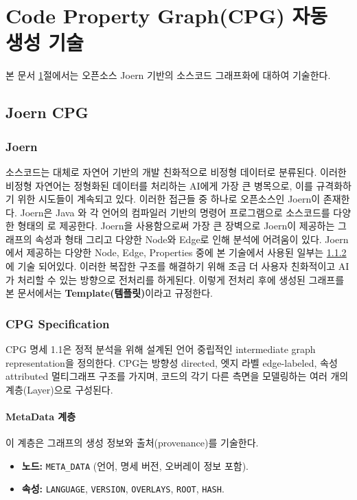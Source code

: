 \clearpage

\section{Code Property Graph(CPG) 자동 생성 기술}\label{sec:cpg}

본 문서 \ref{sec:cpg}절에서는 오픈소스 Joern 기반의 소스코드 그래프화에 대하여 기술한다.

\subsection{Joern CPG}

\subsubsection{Joern}
소스코드는 대체로 자연어 기반의 개발 친화적으로 비정형 데이터로 분류된다.
이러한 비정형 자연어는 정형화된 데이터를 처리하는 AI에게 가장 큰 병목으로, 이를 규격화하기 위한 시도들이 계속되고 있다.
이러한 접근들 중 하나로 오픈소스인 Joern이 존재한다.
Joern은 Java 와 각 언어의 컴파일러 기반의 명령어 프로그램으로 소스코드를 다양한 형태의 \textbf{\abbrCPG}로 제공한다.
Joern을 사용함으로써 가장 큰 장벽으로 Joern이 제공하는 그래프의 속성과 형태 그리고 다양한 Node와 Edge로 인해 분석에 어려움이 있다.
Joern에서 제공하는 다양한 Node, Edge, Properties 중에 본 기술에서 사용된 일부는 \ref{subsubsec:cpgspec}에 기술 되어있다.
이러한 복잡한 구조를 해결하기 위해 조금 더 사용자 친화적이고 AI가 처리할 수 있는 방향으로 전처리를 하게된다.
이렇게 전처리 후에 생성된 그래프를 본 문서에서는 \textbf{Template(템플릿)}이라고 규정한다.

\subsubsection{CPG Specification}\label{subsubsec:cpgspec}
CPG 명세 1.1은 정적 분석을 위해 설계된 언어 중립적인 intermediate graph representation을 정의한다. CPG는 방향성 directed, 엣지 라벨 edge-labeled, 속성 attributed 멀티그래프 구조를 가지며, 코드의 각기 다른 측면을 모델링하는 여러 개의 계층(Layer)으로 구성된다.

\paragraph{MetaData 계층} 이 계층은 그래프의 생성 정보와 출처(provenance)를 기술한다.
\begin{itemize} \setlength{\itemsep}{0pt} \setlength{\parskip}{0pt} \setlength{\topsep}{0pt} \setlength{\partopsep}{0pt}
    \item \textbf{노드:} \texttt{META\_DATA} (언어, 명세 버전, 오버레이 정보 포함).
    \item \textbf{속성:} \texttt{LANGUAGE}, \texttt{VERSION}, \texttt{OVERLAYS}, \texttt{ROOT}, \texttt{HASH}.
\end{itemize}

